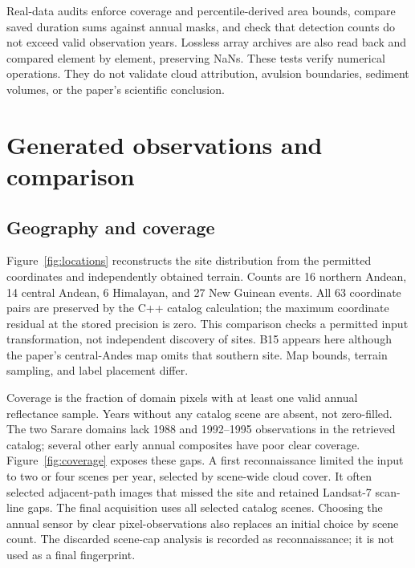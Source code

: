\documentclass[11pt]{article}
\begin{document}
\begin{center}\end{center}
Real-data audits enforce coverage and percentile-derived area bounds, compare
saved duration sums against annual masks, and check that detection counts do
not exceed valid observation years. Lossless array archives are also read back
and compared element by element, preserving NaNs. These tests verify numerical
operations. They do not validate cloud attribution, avulsion boundaries,
sediment volumes, or the paper's scientific conclusion.

\section{Generated observations and comparison}
\subsection{Geography and coverage}
Figure~\ref{fig:locations} reconstructs the site distribution from the
permitted coordinates and independently obtained terrain. Counts are 16
northern Andean, 14 central Andean, 6 Himalayan, and 27 New Guinean events.
All 63 coordinate pairs are preserved by the C++ catalog calculation; the
maximum coordinate residual at the stored precision is zero. This comparison
checks a permitted input transformation, not independent discovery of sites.
B15 appears here although the paper's central-Andes map omits that southern
site. Map bounds, terrain sampling, and label placement differ.

\begin{center}\small\end{center}
Coverage is the fraction of domain pixels with at least one valid annual
reflectance sample. Years without any catalog scene are absent, not zero-filled.
The two Sarare domains lack 1988 and 1992--1995 observations in the retrieved
catalog; several other early annual composites have poor clear coverage.
Figure~\ref{fig:coverage} exposes these gaps. A first reconnaissance limited
the input to two or four scenes per year, selected by scene-wide cloud cover.
It often selected adjacent-path images that missed the site and retained
Landsat-7 scan-line gaps. The final acquisition uses all selected catalog
scenes. Choosing the annual sensor by clear pixel-observations also replaces
an initial choice by scene count. The discarded scene-cap analysis is recorded
as reconnaissance; it is not used as a final fingerprint.
\end{document}
